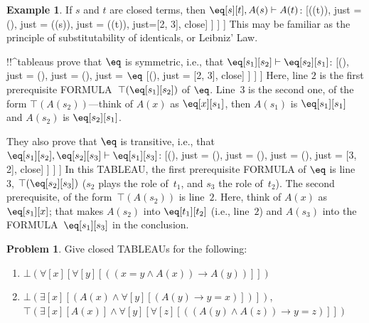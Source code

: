 \documentclass[10pt,a4paper]{article}
\newcommand*{\olup}[1]{\MakeUppercase{#1}}
\theoremstyle{plain}
\theoremstyle{definition}
\newtheorem{ex}[thm]{Example}
\newtheorem{prob}{Problem}[section]
\theoremstyle{remark}
\newenvironment{oltableau}{}{}
\providecommand{\lif}{\mathbin{\rightarrow}}
\providecommand{\lforall}{\mathord{\forall}}
\providecommand{\lexists}{\mathord{\exists}}
\providecommand{\Proves}{\mathrel{\vdash}}
\providecommand{\sFmla}[2]{#1(#2)}
\providecommand{\formula}{\relax}
\providecommand{\True}{\top}
\providecommand{\False}{\bot}
\providecommand{\TAss}[1]{}
\providecommand{\TRule}[1]{}
\providecommand{\formula}[1]{#1}
\begin{document}
\begin{ex}
If $s$ and $t$ are closed terms, then $\eq[s][t], A(s)
\Proves A(t)$:
\begin{oltableau}
  [\sFmla{\False}{\formula{A}(t)}, just = \TAss
    [\sFmla{\True}{\eq[s][t]}, just = \TAss
      [\sFmla{\True}{\formula{A}(s)}, just = \TAss
        [\sFmla{\True}{\formula{A}(t)}, just={\TRule{\True}{\eq}[2, 3]}, close]
      ]
    ]
  ]
\end{oltableau}
This may be familiar as the principle of substitutability of
identicals, or Leibniz' Law.

!!^{tableau}s prove that $\eq$ is symmetric, i.e., that $\eq[s_1][s_2]
\Proves \eq[s_2][s_1]$:
\begin{oltableau}
  [\sFmla{\False}{\eq[s_2][s_1]}, just = \TAss
    [\sFmla{\True}{\eq[s_1][s_2]}, just = \TAss
      [\sFmla{\True}{\eq[s_1][s_1]}, just = {$\eq$}
        [\sFmla{\True}{\eq[s_2][s_1]}, just = {\TRule{\True}{\eq}[2, 3]}, close]
      ]
    ]
  ]
\end{oltableau}
Here, line $2$ is the first prerequisite
\olup{formula}~$\sFmla{\True}{\eq[s_1][s_2]}$ of $\TRule{\True}{\eq}$.
Line~$3$ is the second one, of the form $\sFmla{\True}{A(s_2)}$---think of
$A(x)$ as
$\eq[x][s_1]$, then $A(s_1)$ is $\eq[s_1][s_1]$ and $A(s_2)$ is $\eq[s_2][s_1]$.

They also prove that $\eq$ is transitive, i.e., that $\eq[s_1][s_2],
\eq[s_2][s_3] \Proves \eq[s_1][s_3]$:
\begin{oltableau}
  [\sFmla{\False}{\eq[s_1][s_3]}, just = \TAss
    [\sFmla{\True}{\eq[s_1][s_2]}, just = \TAss
      [\sFmla{\True}{\eq[s_2][s_3]}, just = \TAss
        [\sFmla{\True}{\eq[s_1][s_3]}, just = {\TRule{\True}{\eq}[3, 2]}, close]
      ]
    ]
  ]
\end{oltableau}
In this \olup{tableau}, the first prerequisite \olup{formula} of
$\TRule{\True}{\eq}$ is line~$3$, $\sFmla{\True}{\eq[s_2][s_3]}$
($s_2$ plays the role of~$t_1$, and $s_3$ the role of~$t_2$). The
second prerequisite, of the form~$\sFmla{\True}{A(s_2)}$ is line~$2$.
Here, think of $A(x)$ as $\eq[s_1][x]$; that makes $A(s_2)$ into
$\eq[t_1][t_2]$ (i.e., line~$2$) and $A(s_3)$ into the
\olup{formula}~$\eq[s_1][s_3]$ in the conclusion.
\end{ex}

\begin{prob}
Give closed \olup{tableau}s for the following:
\begin{enumerate}
\item $\sFmla{\False}{\lforall[x][\lforall[y][((x = y \land A(x))
      \lif A(y))]]}$
\item $\sFmla{\False}{\lexists[x][(A(x) \land
    \lforall[y][(A(y) \lif y = x)])]}$,\\
  $\sFmla{\True}{\lexists[x][A(x)] \land
    \lforall[y][\lforall[z][((A(y) \land A(z)) \lif y = z)]]}$
\end{enumerate}
\end{prob}
\end{document}
